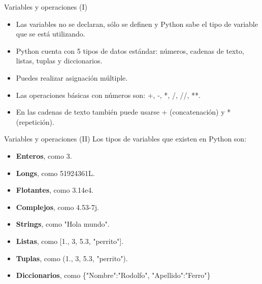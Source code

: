 \documentclass[usenames,dvipsnames]{beamer}
\begin{document}
  \begin{frame}{Variables y operaciones (I)}
    \begin{itemize}
      \item Las variables no se declaran, sólo se definen y Python sabe el
      tipo de variable que se está utilizando.

      \item Python cuenta con 5 tipos de datos estándar: números, cadenas
      de texto, listas, tuplas y diccionarios.

      \item Puedes realizar asignación múltiple.

      \item Las operaciones básicas con números son: +, -, *, /, //, **.

      \item En las cadenas de texto también puede usarse + (concatenación)
      y * (repetición).
    \end{itemize}
  \end{frame}

  \begin{frame}{Variables y operaciones (II)}
    Los tipos de variables que existen en Python son:
    \begin{itemize}
      \item \textbf{Enteros}, como 3.
      \item \textbf{Longs}, como 51924361L.
      \item \textbf{Flotantes}, como 3.14e4.
      \item \textbf{Complejos}, como 4.53-7j.
      \item \textbf{Strings}, como "Hola mundo".
      \item \textbf{Listas}, como [1., 3, 5.3, "perrito"].
      \item \textbf{Tuplas}, como (1., 3, 5.3, "perrito").
      \item \textbf{Diccionarios}, como \{"Nombre":"Rodolfo", "Apellido":"Ferro"\}
    \end{itemize}
  \end{frame}

\end{document}
